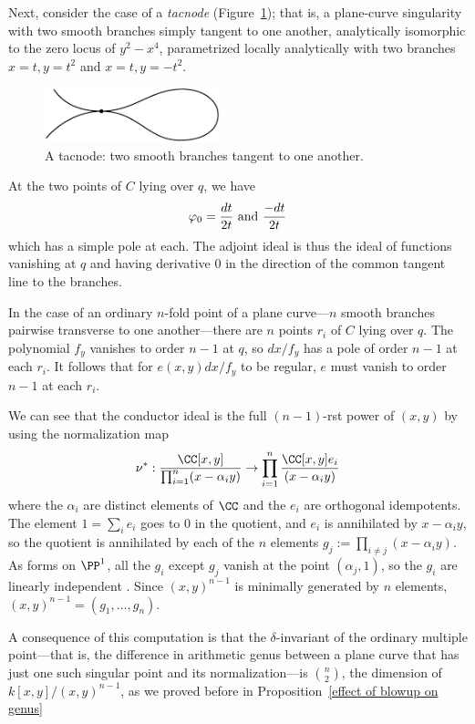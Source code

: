 \begin{example}[tacnodes]
Next, consider the case of a \emph{tacnode} (Figure~\ref{Fig14.4}); that is, a plane-curve singularity with two smooth branches simply tangent to one another, analytically isomorphic to the zero locus of $y^2-x^4$, parametrized locally analytically with two branches $x = t, y =  t^{2}$ and $x=t, y = -t^{2}$.

\begin{figure}
\centerline {\includegraphics[width=2in]{"main/Fig14-4"}}
\caption{A tacnode: two smooth branches tangent to one another.}
\label{Fig14.4}
\end{figure}

At the two points of $C$ lying over $q$, we have
  $$
 \varphi_0 =  \frac{dt}{ 2t} \hbox{ and } \frac{-dt}{ 2t}
 $$ 
which has a simple pole at each. 
The adjoint ideal is thus the ideal of functions vanishing at $q$ and having derivative 0 in the direction of the common tangent line to the branches.
\end{example}

\begin{example}
In the case of an ordinary $n$-fold point of a plane curve---$n$ smooth branches pairwise transverse to one another---there are $n$ points
$r_i$ of $C$ lying over $q$. The polynomial $f_y$ vanishes to order $n-1$ at $q$, so $dx/f_y$ has a pole of order $n-1$ at
each $r_i$. It follows that for $e(x,y)dx/f_y$ to be regular, $e$ must vanish to order $n-1$ at each $r_i$. 

We can see that the conductor ideal is the full $(n-1)$-rst power of $(x,y)$ by using the
normalization map
$$
\nu^{*}: \frac{\CC[x,y]}{\prod_{i=1}^{n} (x-\alpha_{i}y)} \to
 \prod_{i=1}^{n} \frac{\CC[x,y]e_{i}}{(x-\alpha_{i}y)}
$$
where the $\alpha_{i}$ are distinct elements of $\CC$ and the $e_{i}$ are orthogonal idempotents.
The element $1 = \sum_{i}e_{i}$ goes to 0 in the quotient, and $e_{i}$ is annihilated by $x-\alpha_{i}y$,
so the quotient is annihilated by each of the $n$ elements $g_{j} := \prod_{i\neq j} (x-\alpha_{i}y)$.
As forms on $\PP^{1}$, all the $g_{i}$ except $g_{j}$ vanish at the 
point $(\alpha_{j}, 1)$, so the $g_{i}$ are linearly independent . Since $(x,y)^{n-1}$ is minimally generated by $n$ elements, $(x,y)^{n-1} = (g_{1}, \dots, g_{n})$.

A consequence of this computation is that the $\delta$-invariant of the ordinary multiple point---that is, the difference in arithmetic genus between a plane curve that has just one such singular point and its normalization---is $\binom{n}{2}$, the dimension of $k[x,y]/(x,y)^{n-1}$, as we proved before in Proposition~\ref{effect of blowup on genus} \end{example}

